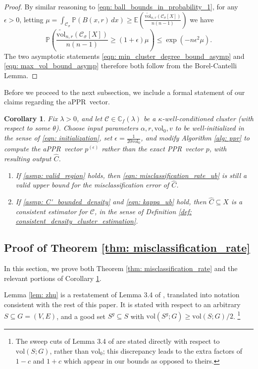 \documentclass{article}
\newcommand{\vol}{\mathrm{vol}}
\newcommand{\1}{\mathbf{1}}
\newcommand{\pbf}{p}        %
\newcommand{\Xbf}{X}             %
\newcommand{\Pbb}{\mathbb{P}}
\newcommand{\Cbb}{\mathbb{C}}
\newcommand{\Ebb}{\mathbb{E}}
\newcommand{\Cset}{\mathcal{C}}
\newcommand{\Csig}{\Cset_{\sigma}}
\newcommand{\Cest}{\widehat{C}}
\newcommand{\dx}{\,dx}
\newcommand{\pprspace}{{\sc PPR~}}
\theoremstyle{aldenthm}
\newtheorem{corollary}{Corollary}
\theoremstyle{aldenrmrk}
\begin{document}
\begin{proof}
	By similar reasoning to \eqref{eqn: ball_bounds_in_probability_1}, for any $\epsilon > 0$, letting $\mu = \int_{\Csig} \Pbb(B(x,r) \dx) \geq \Ebb\left(\frac{\widetilde{\vol}_{n,r}(\Csig[\Xbf])}{n(n-1)}\right)$ we have
	\begin{equation*}
	\Pbb\left(\frac{\widetilde{\vol}_{n,r}(\Csig[\Xbf])}{n(n-1)} \geq (1 + \epsilon)\mu \right) \leq \exp(-n\epsilon^2\mu).
	\end{equation*}
	The two asymptotic statements \eqref{eqn: min_cluster_degree_bound_asymp} and \eqref{eqn: max_vol_bound_asymp} therefore both follow from the Borel-Cantelli Lemma.
\end{proof}

Before we proceed to the next subsection, we include a formal statement of our claims regarding the a\pprspace vector. 
\begin{corollary}
	\label{cor: appr}
	Fix $\lambda > 0$, and let $\Cset \in \Cbb_f(\lambda)$ be a $\kappa$-well-conditioned cluster (with respect to some $\theta$). Choose input parameters $\alpha, r, \vol_0, v$ to be well-initialized in the sense of \eqref{eqn: initialization}, set $\epsilon = \frac{1}{20 \vol_0}$, and modify Algorithm \ref{alg: ppr} to compute the a\pprspace vector $\pbf^{(\epsilon)}$ rather than the exact \pprspace vector $\pbf$, with resulting output $\Cest$.
	\begin{enumerate}
		\item If \ref{asmp: valid_region} holds, then \eqref{eqn: misclassification_rate_ub} is still a valid upper bound for the misclassification error of $\Cest$.
		\item If \ref{asmp: C'_bounded_density} and \eqref{eqn: kappa_ub} hold, 
		then $\Cest \subseteq \Xbf$ is a consistent estimator for $\Cset$, in the sense of Definition \ref{def: consistent_density_cluster_estimation}.
	\end{enumerate}
\end{corollary}

\subsection{Proof of Theorem \ref{thm: misclassification_rate}}
\label{sec: proof_of_misclassification_rate}

In this section, we prove both Theorem \ref{thm: misclassification_rate} and the relevant portions of Corollary \ref{cor: appr}.

Lemma \ref{lem: zhu} is a restatement of Lemma 3.4 of \cite{zhu2013}, translated into notation consistent with the rest of this paper. It is stated with respect to an arbitrary $S \subseteq G = (V,E)$, and a good set $S^g \subseteq S$ with $\vol(S^g; G) \geq \vol(S; G)/2$. \footnote{The sweep cuts of Lemma 3.4 of \cite{zhu2013} are stated directly with respect to $\vol(S;G)$, rather than $\vol_0$; this discrepancy leads to the extra factors of $1 - c$ and $1 + c$ which appear in our bounds as opposed to theirs.}
\end{document}
